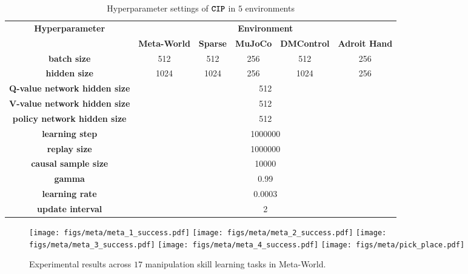 \begin{table}[h]
 \centering
\renewcommand{\arraystretch}{1.2}
\setlength{\tabcolsep}{4pt}
\caption{Hyperparameter settings of $\texttt{\textbf{CIP}}$ in $5$ environments}
\label{tab:hps}
% 
\begin{tabular}{cccccc}
\hline
\multirow{2}{*}{\textbf{Hyperparameter}} & \multicolumn{5}{c}{\textbf{Environment}}                        \\ \cline{2-6} 
                                & \textbf{Meta-World} & \textbf{Sparse} & \textbf{MuJoCo} & \textbf{DMControl} & \textbf{Adroit Hand} \\ \hline
\textbf{batch size }                     & 512        & 512    & 256    & 512       & 256         \\
\textbf{hidden size  }                   & 1024       & 1024   & 256    & 1024      & 256         \\
\textbf{Q-value network hidden size}                       & \multicolumn{5}{c}{512}                            \\
\textbf{V-value network hidden size}                       & \multicolumn{5}{c}{512}                            \\
\textbf{policy network hidden size}                       & \multicolumn{5}{c}{512}                            \\
\textbf{learning step}                       & \multicolumn{5}{c}{1000000}                            \\
\textbf{replay size}                     & \multicolumn{5}{c}{1000000}                            \\
\textbf{causal sample size}              & \multicolumn{5}{c}{10000}                              \\
\textbf{gamma}                           & \multicolumn{5}{c}{0.99}                               \\
\textbf{learning rate}                   & \multicolumn{5}{c}{0.0003}                             \\ 
\textbf{update interval}                   & \multicolumn{5}{c}{2}                             \\
\hline
\end{tabular}
\end{table}


\begin{figure}[t]
    \centering
    \texttt{[image: figs/meta/meta\_1\_success.pdf]}
    \texttt{[image: figs/meta/meta\_2\_success.pdf]}
    \texttt{[image: figs/meta/meta\_3\_success.pdf]}
    \texttt{[image: figs/meta/meta\_4\_success.pdf]}
    \texttt{[image: figs/meta/pick\_place.pdf]} 
    \caption{Experimental results across $17$ manipulation skill learning tasks in Meta-World.}
    \label{fig:appendix_manipulation}
\end{figure}

